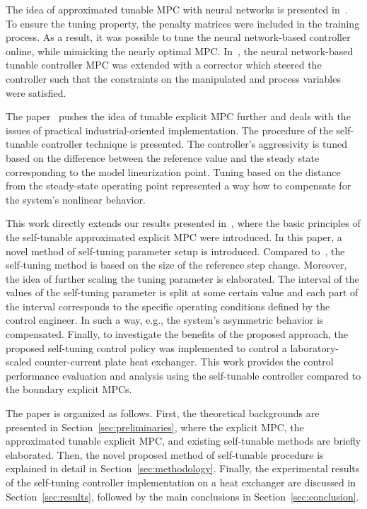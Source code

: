 \documentclass[preprint,12pt]{elsarticle}
\begin{document}
	The idea of approximated tunable MPC with neural networks is presented in~\cite{Kis_NN_MPC}. To ensure the tuning property, the penalty matrices were included in the training process. As a result, it was possible to tune the neural network-based controller online, while mimicking the nearly optimal MPC. In~\cite{Kis_NN_MPC_corrector}, the neural network-based tunable controller MPC was extended with a corrector which steered the controller such that the constraints on the manipulated and process variables were satisfied. 
	
	The paper~\cite{self_tunable} pushes the idea of tunable explicit MPC further and deals with the issues of practical industrial-oriented implementation. The procedure of the self-tunable controller technique is presented. The controller's aggressivity is tuned based on the difference between the reference value and the steady state corresponding to the model linearization point. Tuning based on the distance from the steady-state operating point represented a way how to compensate for the system's nonlinear behavior.
	
	This work directly extends our results presented in~\cite{self_tunable}, where the basic principles of the self-tunable approximated explicit MPC were introduced. In this paper, a novel method of self-tuning parameter setup is introduced. Compared to~\cite{self_tunable}, the self-tuning method is based on the size of the reference step change. Moreover, the idea of further scaling the tuning parameter is elaborated. The interval of the values of the self-tuning parameter is split at some certain value and each part of the interval corresponds to the specific operating conditions defined by the control engineer. In such a way, e.g., the system's asymmetric behavior is compensated. Finally, to investigate the benefits of the proposed approach, the proposed self-tuning control policy was implemented to control a laboratory-scaled counter-current plate heat exchanger. This work provides the control performance evaluation and analysis using the self-tunable controller compared to the boundary explicit MPCs.
	
	The paper is organized as follows. First, the theoretical backgrounds are presented in Section~\ref{sec:preliminaries}, where the explicit MPC, the approximated tunable explicit MPC, and existing self-tunable methods are briefly elaborated. Then, the novel proposed method of self-tunable procedure is explained in detail in Section~\ref{sec:methodology}. Finally, the experimental results of the self-tuning controller implementation on a heat exchanger are discussed in Section~\ref{sec:results}, followed by the main conclusions in Section~\ref{sec:conclusion}.
	
\end{document}
